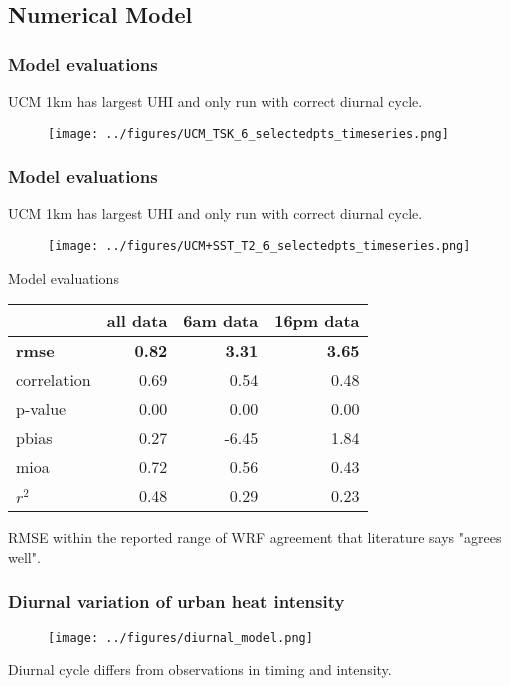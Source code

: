 \documentclass[aspectratio=169, 10pt]{beamer}
\begin{document}
\subsection{Numerical Model}


\begin{frame}
\frametitle{Model evaluations}
UCM 1km has largest UHI and only run with correct diurnal cycle. 
\begin{figure}
\texttt{[image: ../figures/UCM\_TSK\_6\_selectedpts\_timeseries.png]}
\end{figure}
\end{frame}

\begin{frame}
\frametitle{Model evaluations}
UCM 1km has largest UHI and only run with correct diurnal cycle. 
\begin{figure}
\texttt{[image: ../figures/UCM+SST\_T2\_6\_selectedpts\_timeseries.png]}
\end{figure}
\end{frame}

\begin{frame}{Model evaluations}
\center
\begin{tabular}{lrrr}
\toprule
{} &  all data &     6am data&   16pm data \\
\midrule
\bf rmse        &    \bf  0.82 & \bf 3.31 & \bf 3.65 \\
correlation &      0.69 &  0.54 & 0.48 \\
p-value     &      0.00 &  0.00 & 0.00 \\
pbias       &      0.27 & -6.45 & 1.84 \\
mioa        &      0.72 &  0.56 & 0.43 \\
$r^2$   &      0.48 &  0.29 & 0.23 \\
\bottomrule
\end{tabular}


RMSE within the reported range of WRF agreement that literature says "agrees well". 
\end{frame}

\begin{frame}
\frametitle{Diurnal variation of urban heat intensity}
\begin{figure}
\texttt{[image: ../figures/diurnal\_model.png]}
\end{figure}
Diurnal cycle differs from observations in timing and intensity. 
\end{frame}
\end{document}
